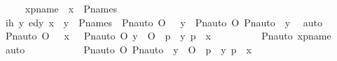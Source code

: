 \begin{isabellebody}
\ \ \ \ \ xpname\ {\isacharcolon}{\kern0pt}\ {\isachardoublequoteopen}x\ {\isasymin}\ P{\isacharunderscore}{\kern0pt}names{\isachardoublequoteclose}\ \isanewline
\isanewline
\ \ \ \ \isamarkupfalse%
\ \isamarkupfalse%
\ ih{\isacharcolon}{\kern0pt}\ {\isachardoublequoteopen}{\isasymAnd}y{\isachardot}{\kern0pt}\ ed{\isacharparenleft}{\kern0pt}y{\isacharcomma}{\kern0pt}\ x{\isacharparenright}{\kern0pt}\ {\isasymLongrightarrow}\ y\ {\isasymin}\ P{\isacharunderscore}{\kern0pt}names\ {\isasymLongrightarrow}\ Pn{\isacharunderscore}{\kern0pt}auto{\isacharparenleft}{\kern0pt}{\isasympi}\ O\ {\isasymtau}{\isacharparenright}{\kern0pt}\ {\isacharbackquote}{\kern0pt}\ y\ {\isacharequal}{\kern0pt}\ {\isacharparenleft}{\kern0pt}Pn{\isacharunderscore}{\kern0pt}auto{\isacharparenleft}{\kern0pt}{\isasympi}{\isacharparenright}{\kern0pt}\ O\ Pn{\isacharunderscore}{\kern0pt}auto{\isacharparenleft}{\kern0pt}{\isasymtau}{\isacharparenright}{\kern0pt}{\isacharparenright}{\kern0pt}\ {\isacharbackquote}{\kern0pt}\ y{\isachardoublequoteclose}\ \isamarkupfalse%
\ auto\isanewline
\isanewline
\ \ \ \ \isamarkupfalse%
\ {\isachardoublequoteopen}Pn{\isacharunderscore}{\kern0pt}auto{\isacharparenleft}{\kern0pt}{\isasympi}\ O\ {\isasymtau}{\isacharparenright}{\kern0pt}\ {\isacharbackquote}{\kern0pt}\ x\ {\isacharequal}{\kern0pt}\ {\isacharbraceleft}{\kern0pt}\ {\isacharless}{\kern0pt}Pn{\isacharunderscore}{\kern0pt}auto{\isacharparenleft}{\kern0pt}{\isasympi}\ O\ {\isasymtau}{\isacharparenright}{\kern0pt}{\isacharbackquote}{\kern0pt}y{\isacharcomma}{\kern0pt}\ {\isacharparenleft}{\kern0pt}{\isasympi}\ O\ {\isasymtau}{\isacharparenright}{\kern0pt}{\isacharbackquote}{\kern0pt}\ p{\isachargreater}{\kern0pt}\ {\isachardot}{\kern0pt}\ {\isacharless}{\kern0pt}y{\isacharcomma}{\kern0pt}\ p{\isachargreater}{\kern0pt}\ {\isasymin}\ x\ {\isacharbraceright}{\kern0pt}{\isachardoublequoteclose}\ \isanewline
\ \ \ \ \ \ \isamarkupfalse%
\ Pn{\isacharunderscore}{\kern0pt}auto\ xpname\ \isamarkupfalse%
\ auto\ \isanewline
\ \ \ \ \isamarkupfalse%
\ \isamarkupfalse%
\ {\isachardoublequoteopen}{\isachardot}{\kern0pt}{\isachardot}{\kern0pt}{\isachardot}{\kern0pt}\ {\isacharequal}{\kern0pt}\ {\isacharbraceleft}{\kern0pt}\ {\isacharless}{\kern0pt}{\isacharparenleft}{\kern0pt}Pn{\isacharunderscore}{\kern0pt}auto{\isacharparenleft}{\kern0pt}{\isasympi}{\isacharparenright}{\kern0pt}\ O\ Pn{\isacharunderscore}{\kern0pt}auto{\isacharparenleft}{\kern0pt}{\isasymtau}{\isacharparenright}{\kern0pt}{\isacharparenright}{\kern0pt}\ {\isacharbackquote}{\kern0pt}\ y{\isacharcomma}{\kern0pt}\ {\isacharparenleft}{\kern0pt}{\isasympi}\ O\ {\isasymtau}{\isacharparenright}{\kern0pt}{\isacharbackquote}{\kern0pt}\ p{\isachargreater}{\kern0pt}\ {\isachardot}{\kern0pt}\ {\isacharless}{\kern0pt}y{\isacharcomma}{\kern0pt}\ p{\isachargreater}{\kern0pt}\ {\isasymin}\ x\ {\isacharbraceright}{\kern0pt}{\isachardoublequoteclose}\isanewline

\end{isabellebody}
